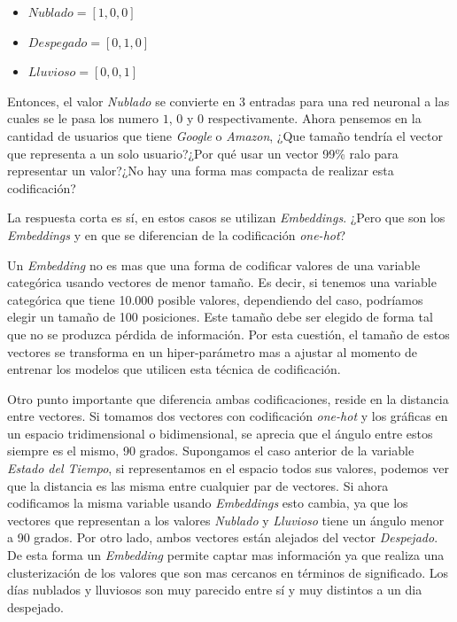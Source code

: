 \documentclass[11pt,a4paper,twoside]{thesis}
\begin{document}
\begin{itemize}
	\item $Nublado    = [1, 0, 0]$
	\item $Despegado  = [0, 1, 0]$
	\item $Lluvioso   = [0, 0, 1]$
\end{itemize}

Entonces, el valor \textit{Nublado} se convierte en 3 entradas para una red
neuronal a las cuales se le pasa los numero $1$, $0$ y $0$ respectivamente.
Ahora pensemos en la cantidad de usuarios que tiene \textit{Google} o
\textit{Amazon}, ¿Que tamaño tendría el vector que representa a un solo
usuario?¿Por qué usar un vector 99\% ralo para representar un valor?¿No hay una
forma mas compacta de realizar esta codificación?

La respuesta corta es sí, en estos casos se utilizan \textit{Embeddings}. ¿Pero
que son los \textit{Embeddings} y en que se diferencian de la codificación
\textit{one-hot}?

Un \textit{Embedding} no es mas que una forma de codificar valores de una
variable categórica usando vectores de menor tamaño. Es decir, si tenemos una
variable categórica que tiene 10.000 posible valores, dependiendo del caso,
podríamos elegir un tamaño de 100 posiciones. Este tamaño debe ser elegido de
forma tal que no se produzca pérdida de información. Por esta cuestión, el
tamaño de estos vectores se transforma en un hiper-parámetro mas a ajustar al
momento de entrenar los modelos que utilicen esta técnica de codificación.

Otro punto importante que diferencia ambas codificaciones, reside en la
distancia entre vectores. Si tomamos dos vectores con codificación
\textit{one-hot} y los gráficas en un espacio tridimensional o bidimensional,
se aprecia que el ángulo entre estos siempre es el mismo, 90 grados. Supongamos
el caso anterior de la variable \textit{Estado del Tiempo}, si representamos en
el espacio todos sus valores, podemos ver que la distancia es las misma entre
cualquier par de vectores. Si ahora codificamos la misma variable usando
\textit{Embeddings} esto cambia, ya que los vectores que representan a los
valores \textit{Nublado} y \textit{Lluvioso} tiene un ángulo menor a 90 grados.
Por otro lado, ambos vectores están alejados del vector \textit{Despejado}. De
esta forma un \textit{Embedding} permite captar mas información ya que realiza
una clusterización de los valores que son mas cercanos en términos de
significado. Los días nublados y lluviosos son muy parecido entre sí y muy
distintos a un dia despejado.
\end{document}
